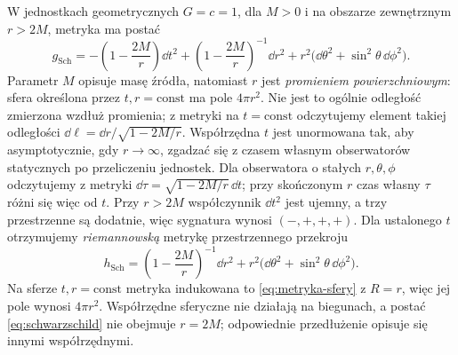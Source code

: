 \begin{przyklad}[Schwarzschild]
\label{prz:metryka-schwarzschild}
W jednostkach geometrycznych $G=c=1$, dla $M>0$
i na obszarze zewnętrznym $r>2M$, metryka ma postać
\begin{equation}\label{eq:schwarzschild}
 g_{\mathrm{Sch}}
 =-\left(1-\frac{2M}{r}\right)\dd t^2
  +\left(1-\frac{2M}{r}\right)^{-1}\dd r^2
  +r^2\bigl(\dd\theta^2+\sin^2\theta\,\dd\phi^2\bigr).
\end{equation}
Parametr $M$ opisuje masę źródła, natomiast $r$
jest \emph{promieniem powierzchniowym}:
sfera określona przez $t,r=\mathrm{const}$
ma pole $4\pi r^2$. Nie jest to ogólnie odległość
zmierzona wzdłuż promienia; z metryki na
$t=\mathrm{const}$ odczytujemy element takiej
odległości $\dd\ell=\dd r/\sqrt{1-2M/r}$.
Współrzędna $t$ jest unormowana tak, aby asymptotycznie, gdy
$r\to\infty$, zgadzać się z czasem własnym obserwatorów
statycznych po przeliczeniu jednostek. Dla obserwatora
o stałych $r,\theta,\phi$ odczytujemy z metryki
$\dd\tau=\sqrt{1-2M/r}\,\dd t$; przy skończonym $r$
czas własny $\tau$ różni się więc od $t$.
Przy $r>2M$ współczynnik $\dd t^2$ jest ujemny,
a trzy przestrzenne są dodatnie, więc sygnatura
wynosi $(-,+,+,+)$. Dla ustalonego $t$
otrzymujemy \emph{riemannowską} metrykę przestrzennego
przekroju
\[
 h_{\mathrm{Sch}}
 =\left(1-\frac{2M}{r}\right)^{-1}\dd r^2
  +r^2\bigl(\dd\theta^2+\sin^2\theta\,\dd\phi^2\bigr).
\]
Na sferze $t,r=\mathrm{const}$ metryka indukowana
to \eqref{eq:metryka-sfery} z $R=r$, więc jej
pole wynosi $4\pi r^2$. Współrzędne sferyczne
nie działają na biegunach, a postać
\eqref{eq:schwarzschild} nie obejmuje $r=2M$;
odpowiednie przedłużenie opisuje się innymi
współrzędnymi.
\end{przyklad}

